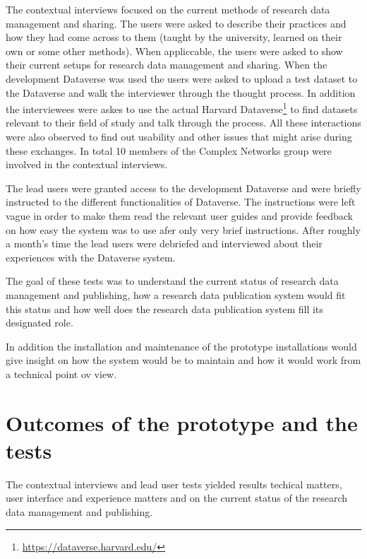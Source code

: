 The contextual interviews focused on the current methods of research data
management and sharing. The users were asked to describe their practices and
how they had come across to them (taught by the university, learned on their
own or some other methods). When appliccable, the users were asked to show
their current setups for research data management and sharing. When the
development Dataverse was used the users were asked to upload a test dataset
to the Dataverse and walk the interviewer through the thought process. In
addition the interviewees were askes to use the actual Harvard
Dataverse\footnote{\url{https://dataverse.harvard.edu/}} to find datasets
relevant to their field of study and talk through the process. All these
interactions were also observed to find out usability and other issues that
might arise during these exchanges. In total 10 members of the Complex
Networks group were involved in the contextual interviews.

The lead users were granted access to the development Dataverse and were
briefly instructed to the different functionalities of Dataverse. The
instructions were left vague in order to make them read the relevant user
guides and provide feedback on how easy the system was to use afer only very
brief instructions. After roughly a month's time the lead users were debriefed
and interviewed about their experiences with the Dataverse system.

The goal of these tests was to understand the current status of research data
management and publishing, how a research data publication system would fit
this status and how well does the research data publication system fill its
designated role.

In addition the installation and maintenance of the prototype installations
would give insight on how the system would be to maintain and how it would work
from a technical point ov view.

\section{Outcomes of the prototype and the tests}
\label{sec:prototype_outcomes}

The contextual interviews and lead user tests yielded results techical matters,
user interface and experience matters and on the current status of the research
data management and publishing.

